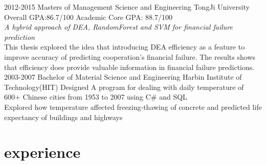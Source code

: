 \documentclass[]{friggeri-cv} %
\begin{document}
\begin{entrylist}
\entry
{2012-2015}
{Masters {\normalfont of Management Science and Engineering}}
{TongJi University}
{Overall GPA:86.7/100 Academic Core GPA: 88.7/100\\
\emph{A hybrid approach of DEA, RandomForest and SVM for financial failure prediction} \\
This thesis explored the idea that introducing DEA efficiency as a feature to improve accuracy of predicting cooperation's financial failure. The results shows that efficiency does provide valuable information in financial failure predictions.}
\entry
{2003-2007}
{Bachelor {\normalfont of Material Science and Engineering}}
{Harbin Institute of Technology(HIT)}
{Designed A program for dealing with  daily temperature of 600+ Chinese cities from 1953 to 2007 using C\# and SQL\\
Explored how temperature affected freezing-thawing of concrete and predicted life expectancy of buildings and highways}
\end{entrylist}







\section{experience}
\end{document}
